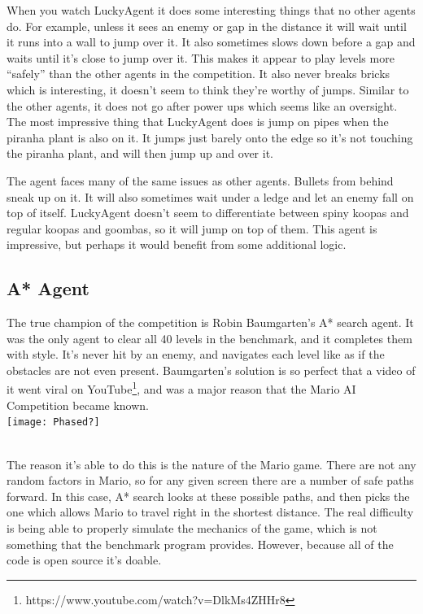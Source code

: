 \documentclass[12pt]{article}
\begin{document}
\begin{multicols*}{2}
When you watch LuckyAgent it does some interesting things that no other agents do.  For example, 
unless it sees an enemy or gap in the distance it will wait until it runs into a wall to jump over it.  
It also sometimes slows down before a gap and waits until it's close to jump over it.  This makes it 
appear to play levels more ``safely'' than the other agents in the competition.  It also never breaks 
bricks which is interesting, it doesn't seem to think they're worthy of jumps.  Similar to the other agents, 
it does not go after power ups which seems like an oversight.  The most impressive thing that 
LuckyAgent does is jump on pipes when the piranha plant is also on it.  It jumps just barely onto the 
edge so it's not touching the piranha plant, and will then jump up and over it.

The agent faces many of the same issues as other agents.  Bullets from behind sneak up on it.  It 
will also sometimes wait under a ledge and let an enemy fall on top of itself.  LuckyAgent doesn't seem 
to differentiate between spiny koopas and regular koopas and goombas, so it will jump on top of them.  
This agent is impressive, but perhaps it would benefit from some additional logic.

\subsection*{A* Agent}
The true champion of the competition is Robin Baumgarten's A* search agent.  It was the only agent 
to clear all 40 levels in the benchmark, and it completes them with style.  It's never hit by an enemy, 
and navigates each level like as if the obstacles are not even present.  Baumgarten's solution is 
so perfect that a video of it went viral on YouTube\footnote{
https://www.youtube.com/watch?v=DlkMs4ZHHr8}, and was a major reason that the 
Mario AI Competition became known.
\hspace{5mm}
\\

\begingroup
    \centering
    \texttt{[image: Phased?]}
\endgroup

\hspace{5mm}
\\
\indent The reason it's able to do this is the nature of the Mario game.  There are not any random factors in 
Mario, so for any given screen there are a number of safe paths forward.  In this case, A* search 
looks at these possible paths, and then picks the one which allows Mario to travel right in the shortest 
distance.  The real difficulty is being able to properly simulate the mechanics of the game, which is 
not something that the benchmark program provides.  However, because all of the code is open source 
it's doable.


\end{multicols*}
\end{document}
